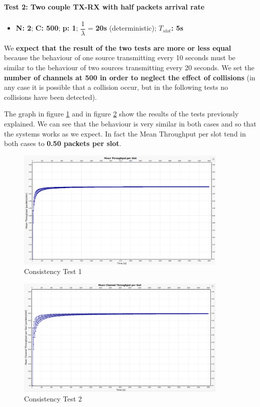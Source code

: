 \paragraph{Test 2: Two couple TX-RX with half packets arrival rate}
\begin{itemize}
	\item \textbf{N: 2}; \textbf{C: 500}; \textbf{p: 1}; $\dfrac{1}{\lambda}$ = \textbf{20s} (deterministic); \textbf{$T_{slot}$: 5s}
\end{itemize}

\noindent We \textbf{expect that the result of the two tests are more or less equal} because the behaviour of one source transmitting every 10 seconds must be similar to the behaviour of two sources transmitting every 20 seconds. We set the \textbf{number of channels at 500 in order to neglect the effect of collisions} (in any case it is possible that a collision occur, but in the following tests no collisions have been detected).

\noindent The graph in figure \ref{img: consistencyTest1a} and in figure \ref{img: consistencyTest1b} show the results of the tests previously explained. We can see that the behaviour is very similar in both cases and so that the systems works as we expect. In fact the Mean Throughput per slot tend in both cases to \textbf{0.50 packets per slot}.

\begin{figure}[H]
	\centering
	\includegraphics[width=0.9\textwidth]{img/consistencyTest1aWithAxis.png}
	\caption{Consistency Test 1}
	\label {img: consistencyTest1a}
\end{figure}

\begin{figure}[H]
	\centering
	\includegraphics[width=0.9\textwidth]{img/consistencyTest1bWithAxis.png}
	\caption{Consistency Test 2}
	\label {img: consistencyTest1b}
\end{figure}

